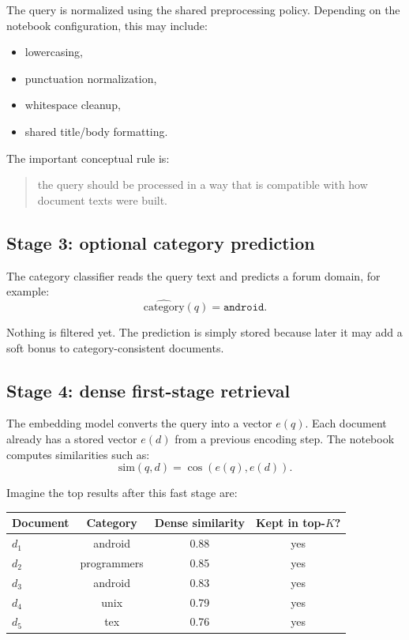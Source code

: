 \documentclass[10pt]{article}
\begin{document}
The query is normalized using the shared preprocessing policy. Depending on the notebook configuration, this may include:
\begin{itemize}
    \item lowercasing,
    \item punctuation normalization,
    \item whitespace cleanup,
    \item shared title/body formatting.
\end{itemize}

The important conceptual rule is:
\begin{quote}
the query should be processed in a way that is compatible with how document texts were built.
\end{quote}

\subsection*{Stage 3: optional category prediction}

The category classifier reads the query text and predicts a forum domain, for example:
\[
\widehat{\mathrm{category}}(q)=\texttt{android}.
\]

Nothing is filtered yet. The prediction is simply stored because later it may add a soft bonus to category-consistent documents.

\subsection*{Stage 4: dense first-stage retrieval}

The embedding model converts the query into a vector \(e(q)\). Each document already has a stored vector \(e(d)\) from a previous encoding step. The notebook computes similarities such as:
\[
\mathrm{sim}(q,d)=\cos(e(q), e(d)).
\]

Imagine the top results after this fast stage are:
\begin{center}
\begin{tabular}{@{}lccc@{}}
\toprule
Document & Category & Dense similarity & Kept in top-\(K\)? \\
\midrule
\(d_1\) & android & 0.88 & yes \\
\(d_2\) & programmers & 0.85 & yes \\
\(d_3\) & android & 0.83 & yes \\
\(d_4\) & unix & 0.79 & yes \\
\(d_5\) & tex & 0.76 & yes \\
\bottomrule
\end{tabular}
\end{center}
\end{document}
